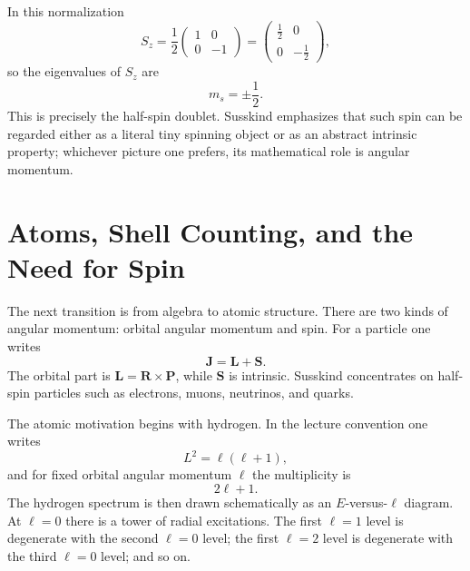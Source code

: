 In this normalization
\begin{equation}
S_{z}=
\frac{1}{2}
\begin{pmatrix}
1&0\\
0&-1
\end{pmatrix}
=
\begin{pmatrix}
\tfrac12&0\\
0&-\tfrac12
\end{pmatrix},
\end{equation}
so the eigenvalues of \(S_{z}\) are
\begin{equation}
m_{s}=\pm\frac{1}{2}.
\end{equation}
This is precisely the half-spin doublet. Susskind emphasizes that such spin can be regarded either as a literal tiny spinning object or as an abstract intrinsic property; whichever picture one prefers, its mathematical role is angular momentum.

\section{Atoms, Shell Counting, and the Need for Spin}

The next transition is from algebra to atomic structure. There are two kinds of angular momentum: orbital angular momentum and spin. For a particle one writes
\begin{equation}
\mathbf{J}=\mathbf{L}+\mathbf{S}.
\end{equation}
The orbital part is \(\mathbf{L}=\mathbf{R}\times\mathbf{P}\), while \(\mathbf{S}\) is intrinsic. Susskind concentrates on half-spin particles such as electrons, muons, neutrinos, and quarks.

The atomic motivation begins with hydrogen. In the lecture convention one writes
\begin{equation}
L^{2}=\ell(\ell+1),
\end{equation}
and for fixed orbital angular momentum \(\ell\) the multiplicity is
\begin{equation}
2\ell+1.
\end{equation}
The hydrogen spectrum is then drawn schematically as an \(E\)-versus-\(\ell\) diagram. At \(\ell=0\) there is a tower of radial excitations. The first \(\ell=1\) level is degenerate with the second \(\ell=0\) level; the first \(\ell=2\) level is degenerate with the third \(\ell=0\) level; and so on.

